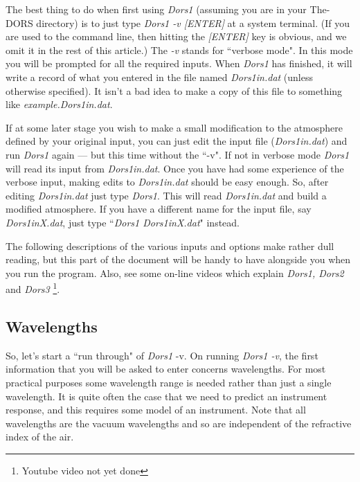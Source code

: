 \documentclass[12pt]{article}
\begin{document}
The best thing to do when first using {\it Dors1} (assuming you are in your {The-DORS} directory) is to just type {\it Dors1 -v [ENTER]} at a system terminal.
(If you are used to the command line, then hitting the {\it [ENTER]} key is obvious, and we omit
it in the rest of this article.)
The { \it -v} stands for ``verbose mode". In this mode you will be prompted for all the required
inputs. When {\it Dors1} has finished, it will write a record of what you entered 
 in the file named  {\it Dors1in.dat} (unless otherwise specified).  It isn't a bad idea to make a copy of this file to something 
like {\it example.Dors1in.dat}.

If at some later stage you wish to make a small modification to the atmosphere defined by your original input, you can 
just edit the input file ({\it Dors1in.dat}) and run {\it Dors1} again --- but this time without the ``-v". If not in verbose
mode {\it Dors1} will read its input from {\it Dors1in.dat}. 
Once you have had some experience of the verbose input, making edits 
to {\it Dors1in.dat} should be easy enough.
So, after editing {\it Dors1in.dat} just type {\it Dors1}. This will read {\it Dors1in.dat} and build a modified
atmosphere. If you have a different name for the input file, say {\it Dors1inX.dat}, just type
``{\it Dors1 Dors1inX.dat}" instead. 


The following descriptions of the various inputs and options make rather dull reading, but this part of
the document will be handy to have alongside
you when you run the program. Also, see some on-line videos which explain 
 {\it Dors1, Dors2} and {\it Dors3} \footnote[2]{Youtube video not yet done}.

\subsection{Wavelengths}

So, let's start a ``run through" of {\it Dors1} -v.
On running {\it Dors1 -v}, the first information that you will be asked to enter concerns wavelengths.
For most practical purposes some wavelength range is needed rather than just a single wavelength. It
is quite often the case that we need to predict an instrument response, and this requires some
model of an instrument. Note that all wavelengths are the vacuum wavelengths and so are independent of the
refractive index of the air.
\end{document}
